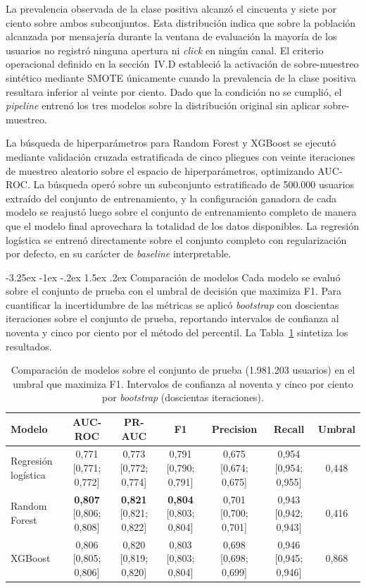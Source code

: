 \documentclass[11pt,a4paper]{article}
\makeatletter
\renewcommand\subsection{\@startsection{subsection}{2}{\z@}%
  {-3.25ex \@plus -1ex \@minus -.2ex}%
  {1.5ex \@plus .2ex}%
  {\normalfont\normalsize\itshape}}
\makeatother
\begin{document}
La prevalencia observada de la clase positiva alcanzó el cincuenta y siete
por ciento sobre ambos subconjuntos. Esta distribución indica que sobre
la población alcanzada por mensajería durante la ventana de evaluación
la mayoría de los usuarios no registró ninguna apertura ni \textit{click}
en ningún canal. El criterio operacional definido en la sección~IV.D
estableció la activación de sobre-muestreo sintético mediante SMOTE
\cite{chawla2002smote} únicamente cuando la prevalencia de la clase
positiva resultara inferior al veinte por ciento. Dado que la condición
no se cumplió, el \textit{pipeline} entrenó los tres modelos sobre la
distribución original sin aplicar sobre-muestreo.

La búsqueda de hiperparámetros para Random Forest y XGBoost se ejecutó
mediante validación cruzada estratificada de cinco pliegues con veinte
iteraciones de muestreo aleatorio sobre el espacio de hiperparámetros,
optimizando AUC-ROC. La búsqueda operó sobre un subconjunto estratificado
de 500.000 usuarios extraído del conjunto de entrenamiento, y la
configuración ganadora de cada modelo se reajustó luego sobre el conjunto
de entrenamiento completo de manera que el modelo final aprovechara la
totalidad de los datos disponibles. La regresión logística se entrenó
directamente sobre el conjunto completo con regularización por defecto,
en su carácter de \textit{baseline} interpretable.

\subsection{Comparación de modelos}
Cada modelo se evaluó sobre el conjunto de prueba con el umbral de
decisión que maximiza F1. Para cuantificar la incertidumbre de las
métricas se aplicó \textit{bootstrap} con doscientas iteraciones sobre
el conjunto de prueba, reportando intervalos de confianza al noventa y
cinco por ciento por el método del percentil. La Tabla~\ref{tab:resultados}
sintetiza los resultados.

\begin{table}[t]
\centering
\caption{Comparación de modelos sobre el conjunto de prueba
(1.981.203 usuarios) en el umbral que maximiza F1. Intervalos de
confianza al noventa y cinco por ciento por \textit{bootstrap}
(doscientas iteraciones).}
\label{tab:resultados}
\small
\begin{tabular}{lcccccc}
\hline
Modelo & AUC-ROC & PR-AUC & F1 & Precision & Recall & Umbral \\
\hline
Regresión logística & 0,771 [0,771; 0,772] & 0,773 [0,772; 0,774] & 0,791 [0,790; 0,791] & 0,675 [0,674; 0,675] & 0,954 [0,954; 0,955] & 0,448 \\
Random Forest       & \textbf{0,807} [0,806; 0,808] & \textbf{0,821} [0,821; 0,822] & \textbf{0,804} [0,803; 0,804] & 0,701 [0,700; 0,701] & 0,943 [0,942; 0,943] & 0,416 \\
XGBoost             & 0,806 [0,805; 0,806] & 0,820 [0,819; 0,820] & 0,803 [0,803; 0,804] & 0,698 [0,698; 0,699] & 0,946 [0,945; 0,946] & 0,868 \\
\hline
\end{tabular}
\end{table}
\end{document}

